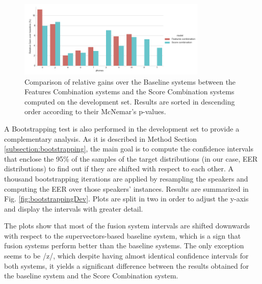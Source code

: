 \begin{figure}[H]
	\centering
	\includegraphics[width=0.8\textwidth]{files/figures/results/relatives/relatives-fusion-systems-dev-mcnemar.png}
	\caption{Comparison of relative gains over the Baseline systems
	between the Features Combination systems
	and the Score Combination systems
	computed on the development set.
	Results are sorted in descending order according to their McNemar's p-values.}
	\label{fig:fusionMcnemarDev}
\end{figure}

A Bootstrapping test is also performed in the development set to provide a complementary
analysis. As it is described in Method Section \ref{subsection:bootstrapping}, the main goal
is to compute the confidence intervals that enclose the 95\% of the samples of
the target distributions (in our case, EER distributions) to find out if they are shifted
with respect to each other. A thousand bootstrapping iterations are applied by resampling
the speakers and computing the EER over those speakers' instances.
Results are summarized in Fig. \ref{fig:bootstrappingDev}. Plots are split in two in order to adjust the y-axis and display the intervals
with greater detail.

The plots show that most of the fusion system intervals are shifted downwards with
respect to the supervectors-based baseline system,
which is a sign that fusion systems perform better than the
baseline systems.
The only exception seems to be /z/, which
despite having almost identical confidence intervals for both systems,
it yields a significant difference
between the results obtained for the baseline system and the Score Combination system.

